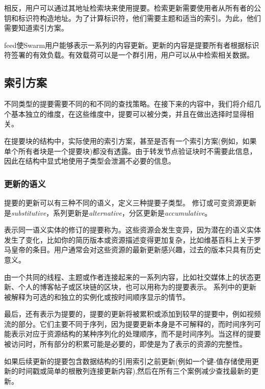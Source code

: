 相反，用户可以通过其地址检索块来使用提要。检索更新需要使用者从所有者的公钥和标识符构造地址。为了计算标识符，他们需要主题和适当的索引。为此，他们需要知道索引方案。

feed使Swarm用户能够表示一系列的内容更新。更新的内容是提要所有者根据标识符签署的有效负载。有效载荷可以是一个群引用，用户可以从中检索相关数据。

\subsection{索引方案\statusyellow}\label{sec:indexing-schemes}

不同类型的提要需要不同的和不同的查找策略。在接下来的内容中，我们将介绍几个基本独立的维度，在这些维度中，提要可以被分类，并且在做出选择时显得相关。


在提要块的结构中，实际使用的索引方案，甚至是否有一个索引方案(例如，如果单个所有者块是一个提要块)都没有透露。由于转发节点验证块时不需要此信息，因此在结构中显式地使用子类型会泄漏不必要的信息。 

\subsubsection{更新的语义}

提要的更新可以有三种不同的语义，定义三种提要子类型。
修订或可变资源更新是\emph{substitutive}，系列更新是\emph{alternative}，分区更新是\emph{accumulative}。 

表示同一语义实体的修订的提要称为。这些资源会发生变异，因为潜在的语义实体发生了变化，比如你的简历版本或资源描述变得更加复杂，比如维基百科上关于罗马皇帝的条目。用户通常会对这些资源的最新更新感兴趣，过去的版本只具有历史意义。

由一个共同的线程、主题或作者连接起来的一系列内容，比如社交媒体上的状态更新、个人的博客帖子或区块链的区块，也可以用称为的提要表示。
系列中的更新被解释为可选的和独立的实例化或按时间顺序显示的情节。

最后，还有表示为提要的，提要的更新将被累积或添加到较早的提要中，例如视频流的部分。它们主要不同于序列，因为提要更新本身是不可解释的，而时间序列可能表示对应于资源结构的某种序列化的处理顺序，而不是时间序列。当这样的提要被访问时，所有部分的积累可能是必要的，即使是为了表示的资源的完整性。

如果后续更新的提要包含数据结构的引用索引之前更新(例如一个键-值存储使用更新的时间戳或简单的根散列连接更新内容),然后在所有三个案例减少查找最新的更新。

